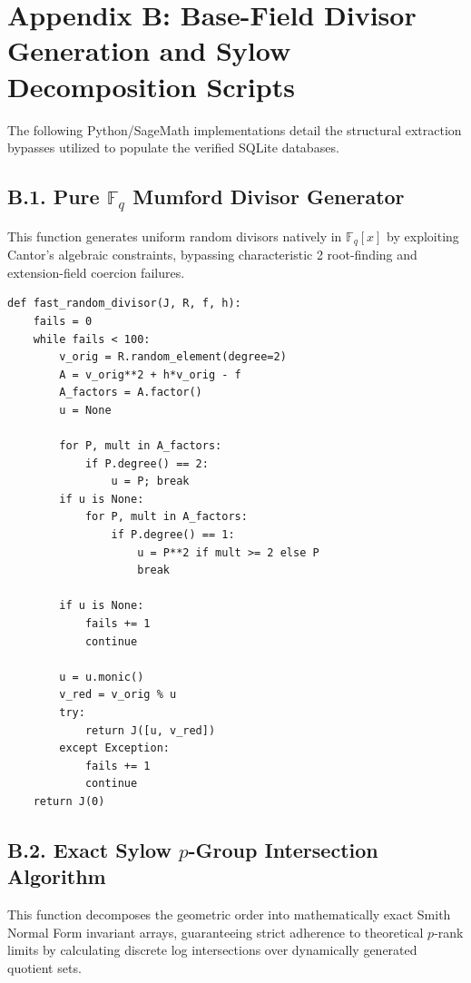 \documentclass[letterpaper, 11pt]{article}
\begin{document}
\section{Appendix B: Base-Field Divisor Generation and Sylow Decomposition Scripts}
The following Python/SageMath implementations detail the structural extraction bypasses utilized to populate the verified SQLite databases. 

\subsection{B.1. Pure \texorpdfstring{$\mathbb{F}_q$}{F\_q} Mumford Divisor Generator}
This function generates uniform random divisors natively in $\mathbb{F}_q[x]$ by exploiting Cantor's algebraic constraints, bypassing characteristic 2 root-finding and extension-field coercion failures.

\begin{verbatim}
def fast_random_divisor(J, R, f, h):
    fails = 0
    while fails < 100:
        v_orig = R.random_element(degree=2)
        A = v_orig**2 + h*v_orig - f
        A_factors = A.factor()
        u = None
        
        for P, mult in A_factors:
            if P.degree() == 2:
                u = P; break
        if u is None:
            for P, mult in A_factors:
                if P.degree() == 1:
                    u = P**2 if mult >= 2 else P
                    break
                    
        if u is None:
            fails += 1
            continue
            
        u = u.monic()
        v_red = v_orig % u
        try:
            return J([u, v_red])
        except Exception:
            fails += 1
            continue
    return J(0) 
\end{verbatim}

\subsection{B.2. Exact Sylow \texorpdfstring{$p$}{p}-Group Intersection Algorithm}
This function decomposes the geometric order into mathematically exact Smith Normal Form invariant arrays, guaranteeing strict adherence to theoretical $p$-rank limits by calculating discrete log intersections over dynamically generated quotient sets.
\end{document}
